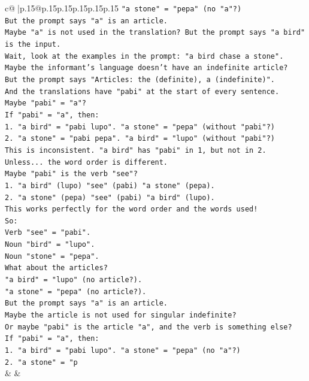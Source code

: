 \documentclass{article}
\begin{document}
{\begin{supertabular}{c@{$\;$}|p{.15\linewidth}@{}p{.15\linewidth}p{.15\linewidth}p{.15\linewidth}p{.15\linewidth}p{.15\linewidth}}
{{{\texttt{"a stone" = "pepa" (no "a"?)} \\
\texttt{But the prompt says "a" is an article.} \\
\texttt{Maybe "a" is not used in the translation? But the prompt says "a bird" is the input.} \\
\texttt{Wait, look at the examples in the prompt: "a bird chase a stone".} \\
\texttt{Maybe the informant's language doesn't have an indefinite article?} \\
\texttt{But the prompt says "Articles: the (definite), a (indefinite)".} \\
\texttt{And the translations have "pabi" at the start of every sentence.} \\
\texttt{Maybe "pabi" = "a"?} \\
\texttt{If "pabi" = "a", then:} \\
\texttt{1. "a bird" = "pabi lupo". "a stone" = "pepa" (without "pabi"?)} \\
\texttt{2. "a stone" = "pabi pepa". "a bird" = "lupo" (without "pabi"?)} \\
\texttt{This is inconsistent. "a bird" has "pabi" in 1, but not in 2.} \\
\texttt{Unless... the word order is different.} \\
\texttt{Maybe "pabi" is the verb "see"?} \\
\texttt{1. "a bird" (lupo) "see" (pabi) "a stone" (pepa).} \\
\texttt{2. "a stone" (pepa) "see" (pabi) "a bird" (lupo).} \\
\texttt{This works perfectly for the word order and the words used!} \\
\texttt{So:} \\
\texttt{Verb "see" = "pabi".} \\
\texttt{Noun "bird" = "lupo".} \\
\texttt{Noun "stone" = "pepa".} \\
\texttt{What about the articles?} \\
\texttt{"a bird" = "lupo" (no article?).} \\
\texttt{"a stone" = "pepa" (no article?).} \\
\texttt{But the prompt says "a" is an article.} \\
\texttt{Maybe the article is not used for singular indefinite?} \\
\texttt{Or maybe "pabi" is the article "a", and the verb is something else?} \\
\texttt{If "pabi" = "a", then:} \\
\texttt{1. "a bird" = "pabi lupo". "a stone" = "pepa" (no "a"?)} \\
\texttt{2. "a stone" = "p} \\
            }
        }
    }
    & & \\ \\


\end{supertabular}}
\end{document}
